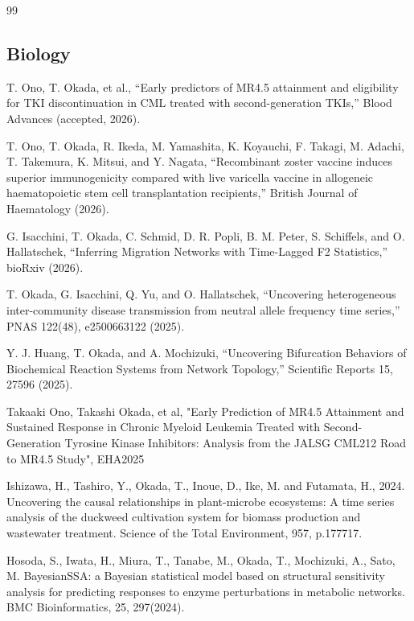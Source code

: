 \documentclass[letterpaper,12pt]{article}
\begin{document}
\begin{thebibliography}{99}


\subsection*{Biology}



\bibitem{}T. Ono, T. Okada, et al., ``Early predictors of MR4.5 attainment and eligibility for TKI discontinuation in CML treated with second-generation TKIs,'' Blood Advances (accepted, 2026).

\bibitem{}T. Ono, T. Okada, R. Ikeda, M. Yamashita, K. Koyauchi, F. Takagi, M. Adachi, T. Takemura, K. Mitsui, and Y. Nagata, ``Recombinant zoster vaccine induces superior immunogenicity compared with live varicella vaccine in allogeneic haematopoietic stem cell transplantation recipients,'' British Journal of Haematology (2026).

\bibitem{}G. Isacchini, T. Okada, C. Schmid, D. R. Popli, B. M. Peter, S. Schiffels, and O. Hallatschek, ``Inferring Migration Networks with Time-Lagged F2 Statistics,'' bioRxiv (2026).

\bibitem{}T. Okada, G. Isacchini, Q. Yu, and O. Hallatschek, ``Uncovering heterogeneous inter-community disease transmission from neutral allele frequency time series,'' PNAS 122(48), e2500663122 (2025).

\bibitem{}Y. J. Huang, T. Okada, and A. Mochizuki, ``Uncovering Bifurcation Behaviors of Biochemical Reaction Systems from Network Topology,'' Scientific Reports 15, 27596 (2025).

\bibitem{} Takaaki Ono, Takashi Okada, et al,
"Early Prediction of MR4.5 Attainment and Sustained Response in Chronic Myeloid Leukemia Treated with Second-Generation Tyrosine Kinase Inhibitors: Analysis from the JALSG CML212 Road to MR4.5 Study", EHA2025

\bibitem{} Ishizawa, H., Tashiro, Y., Okada, T., Inoue, D., Ike, M. and Futamata, H., 2024. Uncovering the causal relationships in plant-microbe ecosystems: A time series analysis of the duckweed cultivation system for biomass production and wastewater treatment. Science of the Total Environment, 957, p.177717.

\bibitem{}Hosoda, S., Iwata, H., Miura, T., Tanabe, M., Okada, T., Mochizuki, A., Sato, M. BayesianSSA: a Bayesian statistical model based on structural sensitivity analysis for predicting responses to enzyme perturbations in metabolic networks. BMC Bioinformatics, 25, 297(2024).


\end{thebibliography}
\end{document}
